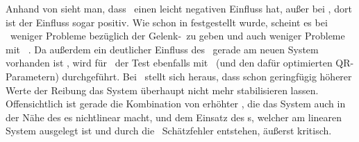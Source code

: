 Anhand von  sieht man, dass \Mceo\ einen leicht negativen Einfluss hat, außer bei \apz, dort ist der Einfluss sogar positiv.
Wie schon in  festgestellt wurde, scheint es bei \apz\ weniger Probleme bezüglich der Gelenk-\crb\ zu geben und auch weniger Probleme mit \beob\ .
Da außerdem ein deutlicher Einfluss des \beob\ gerade am neuen System vorhanden ist , wird für \Mceo\ der Test ebenfalls mit \beob\ (und den dafür optimierten QR-Parametern) durchgeführt.
Bei \apv\ stellt sich heraus, dass schon geringfügig höherer Werte der Reibung das System überhaupt nicht mehr stabilisieren lassen.
Offensichtlich ist gerade die Kombination von erhöhter \crb, die das System auch in der Nähe des \ap es nichtlinear macht, und dem Einsatz des \beob s, welcher am linearen System ausgelegt ist und durch die \crb\ Schätzfehler entstehen, äußerst kritisch.


